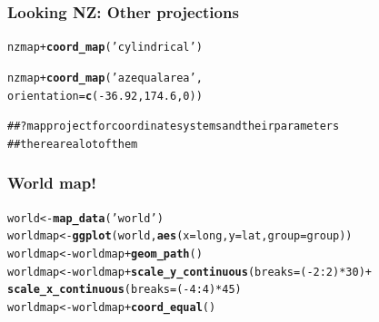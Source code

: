 \documentclass{beamer}\usepackage{graphicx, color}
\makeatletter
\newcommand{\hlfunctioncall}[1]{\textcolor[rgb]{0.501960784313725,0,0.329411764705882}{\textbf{#1}}}%
\newcommand{\hlstring}[1]{\textcolor[rgb]{0.6,0.6,1}{#1}}%
\newcommand{\hlcomment}[1]{\textcolor[rgb]{0.180392156862745,0.6,0.341176470588235}{#1}}%
\newenvironment{kframe}{%
 \def\at@end@of@kframe{}%
 \ifinner\ifhmode%
  \def\at@end@of@kframe{\end{minipage}}%
  \begin{minipage}{\columnwidth}%
 \fi\fi%
 \def\FrameCommand##1{\hskip\@totalleftmargin \hskip-\fboxsep
 \colorbox{shadecolor}{##1}\hskip-\fboxsep
     \hskip-\linewidth \hskip-\@totalleftmargin \hskip\columnwidth}%
 \MakeFramed {\advance\hsize-\width
   \@totalleftmargin\z@ \linewidth\hsize
   \@setminipage}}%
 {\par\unskip\endMakeFramed%
 \at@end@of@kframe}
\newenvironment{knitrout}{}{} %
\makeatother
\begin{document}
\begin{frame}[fragile]
  \frametitle{Looking NZ: Other projections}
\begin{knitrout}\scriptsize
{}\color{fgcolor}\begin{kframe}
\begin{alltt}
nzmap + \hlfunctioncall{coord_map}(\hlstring{'cylindrical'})

nzmap + \hlfunctioncall{coord_map}(\hlstring{'azequalarea'}, 
                  orientation = \hlfunctioncall{c}(-36.92, 174.6, 0))

\hlcomment{## ?mapproject for coordinate systems and their parameters}
\hlcomment{## there are a lot of them}
\end{alltt}
\end{kframe}
\end{knitrout}

\end{frame}

\begin{frame}[fragile]
  \frametitle{World map!}
\begin{knitrout}\scriptsize
{}\color{fgcolor}\begin{kframe}
\begin{alltt}
world <- \hlfunctioncall{map_data}(\hlstring{'world'})
worldmap <- \hlfunctioncall{ggplot}(world, \hlfunctioncall{aes}(x = long, y = lat, group = group))
worldmap <- worldmap + \hlfunctioncall{geom_path}()
worldmap <- worldmap + \hlfunctioncall{scale_y_continuous}(breaks = (-2:2) * 30) + 
            \hlfunctioncall{scale_x_continuous}(breaks = (-4:4) * 45)
worldmap <- worldmap + \hlfunctioncall{coord_equal}()
\end{alltt}
\end{kframe}
\end{knitrout}

\end{frame}
\end{document}
